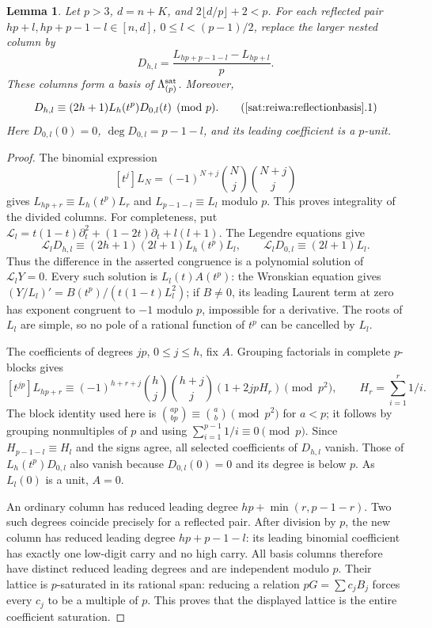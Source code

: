 \documentclass[11pt,a4paper]{article}
\numberwithin{equation}{section}
\newtheorem{lemma}[theorem]{Lemma}
\theoremstyle{definition}\newtheorem{definition}[theorem]{Definition}
\theoremstyle{remark}\newtheorem{remark}[theorem]{Remark}
\begin{document}
\begin{lemma}\label{sat:reiwa:reflectionbasis}
Let $p>3$, $d=n+K$, and $2\lfloor d/p\rfloor+2<p$. For each reflected
pair $hp+l,hp+p-1-l\in[n,d]$, $0\le l<(p-1)/2$, replace the larger
nested column by
\[
 D_{h,l}=\frac{L_{hp+p-1-l}-L_{hp+l}}p.
\]
These columns form a basis of $\Lambda^{\rm sat}_{(p)}$. Moreover,
\[
 D_{h,l}\equiv(2h+1)L_h(t^p)D_{0,l}(t)\pmod p.                 \tag{\ref{sat:reiwa:reflectionbasis}.1}
\]
Here $D_{0,l}(0)=0$, $\deg D_{0,l}=p-1-l$, and its leading
coefficient is a $p$-unit.
\end{lemma}
\begin{proof}
The binomial expression
\[
 [t^j]L_N=(-1)^{N+j}\binom Nj\binom{N+j}j
\]
gives $L_{hp+r}\equiv L_h(t^p)L_r$ and
$L_{p-1-l}\equiv L_l$ modulo $p$. This proves integrality of the
divided columns. For completeness, put
$\mathcal L_l=t(1-t)\partial_t^2+(1-2t)\partial_t+l(l+1)$.
The Legendre equations give
\[
 \mathcal L_l D_{h,l}\equiv
 (2h+1)(2l+1)L_h(t^p)L_l,\qquad
 \mathcal L_lD_{0,l}\equiv(2l+1)L_l.
\]
Thus the difference in the asserted congruence is a polynomial
solution of $\mathcal L_lY=0$. Every such solution is
$L_l(t)A(t^p)$: the Wronskian equation gives
$(Y/L_l)'=B(t^p)/(t(1-t)L_l^2)$; if $B\ne0$, its leading Laurent
term at zero has exponent congruent to $-1$ modulo $p$, impossible
for a derivative. The roots of $L_l$ are simple, so no pole of a
rational function of $t^p$ can be cancelled by $L_l$.

The coefficients of degrees $jp$, $0\le j\le h$, fix $A$.
Grouping factorials in complete $p$-blocks gives
\[
 [t^{jp}]L_{hp+r}\equiv
 (-1)^{h+r+j}\binom hj\binom{h+j}j
       (1+2jpH_r)\pmod{p^2},\qquad H_r=\sum_{i=1}^r1/i.
\]
The block identity used here is
$\binom{ap}{bp}\equiv\binom ab\pmod{p^2}$ for $a<p$;
it follows by grouping nonmultiples of $p$ and using
$\sum_{i=1}^{p-1}1/i\equiv0\pmod p$.
Since $H_{p-1-l}\equiv H_l$ and the signs agree, all selected
coefficients of $D_{h,l}$ vanish. Those of
$L_h(t^p)D_{0,l}$ also vanish because $D_{0,l}(0)=0$ and its
degree is below $p$. As $L_l(0)$ is a unit, $A=0$.

An ordinary column has reduced leading degree
$hp+\min(r,p-1-r)$. Two such degrees coincide precisely for a
reflected pair. After division by $p$, the new column has reduced
leading degree $hp+p-1-l$: its leading binomial coefficient has
exactly one low-digit carry and no high carry. All basis columns
therefore have distinct reduced leading degrees and are independent
modulo $p$. Their lattice is $p$-saturated in its rational span:
reducing a relation $pG=\sum c_jB_j$ forces every $c_j$ to be a
multiple of $p$. This proves that the displayed lattice is the
entire coefficient saturation.
\end{proof}
\end{document}
